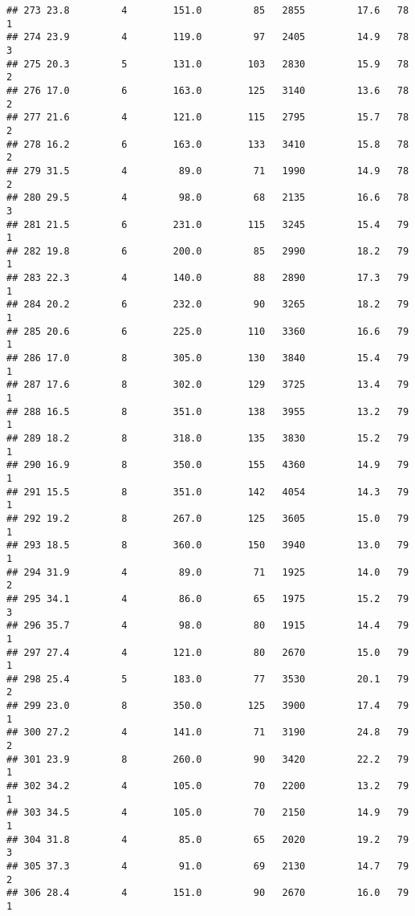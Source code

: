 \documentclass[
]{article}
\begin{document}
\begin{verbatim}
## 273 23.8         4        151.0         85   2855         17.6   78      1
## 274 23.9         4        119.0         97   2405         14.9   78      3
## 275 20.3         5        131.0        103   2830         15.9   78      2
## 276 17.0         6        163.0        125   3140         13.6   78      2
## 277 21.6         4        121.0        115   2795         15.7   78      2
## 278 16.2         6        163.0        133   3410         15.8   78      2
## 279 31.5         4         89.0         71   1990         14.9   78      2
## 280 29.5         4         98.0         68   2135         16.6   78      3
## 281 21.5         6        231.0        115   3245         15.4   79      1
## 282 19.8         6        200.0         85   2990         18.2   79      1
## 283 22.3         4        140.0         88   2890         17.3   79      1
## 284 20.2         6        232.0         90   3265         18.2   79      1
## 285 20.6         6        225.0        110   3360         16.6   79      1
## 286 17.0         8        305.0        130   3840         15.4   79      1
## 287 17.6         8        302.0        129   3725         13.4   79      1
## 288 16.5         8        351.0        138   3955         13.2   79      1
## 289 18.2         8        318.0        135   3830         15.2   79      1
## 290 16.9         8        350.0        155   4360         14.9   79      1
## 291 15.5         8        351.0        142   4054         14.3   79      1
## 292 19.2         8        267.0        125   3605         15.0   79      1
## 293 18.5         8        360.0        150   3940         13.0   79      1
## 294 31.9         4         89.0         71   1925         14.0   79      2
## 295 34.1         4         86.0         65   1975         15.2   79      3
## 296 35.7         4         98.0         80   1915         14.4   79      1
## 297 27.4         4        121.0         80   2670         15.0   79      1
## 298 25.4         5        183.0         77   3530         20.1   79      2
## 299 23.0         8        350.0        125   3900         17.4   79      1
## 300 27.2         4        141.0         71   3190         24.8   79      2
## 301 23.9         8        260.0         90   3420         22.2   79      1
## 302 34.2         4        105.0         70   2200         13.2   79      1
## 303 34.5         4        105.0         70   2150         14.9   79      1
## 304 31.8         4         85.0         65   2020         19.2   79      3
## 305 37.3         4         91.0         69   2130         14.7   79      2
## 306 28.4         4        151.0         90   2670         16.0   79      1

\end{verbatim}
\end{document}
